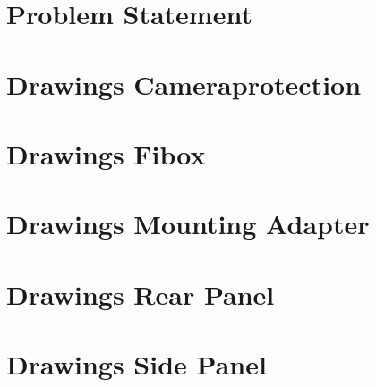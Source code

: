\begin{appendix} 
  \section{Problem Statement}
  \label{app:problem_statement}
  
  
  \section{Drawings Cameraprotection}
  \label{app:drawings_camera_protection}
  
  
  \section{Drawings Fibox}
  \label{app:drawings_fibox_bottom}
  
  
  \section{Drawings Mounting Adapter}
  \label{app:drawings_mounting_adapter}
  
  
  \section{Drawings Rear Panel}
  \label{app:drawings_rear_panel}
  
  
  \section{Drawings Side Panel}
  \label{app:drawings_side_panel}
  

\end{appendix}
